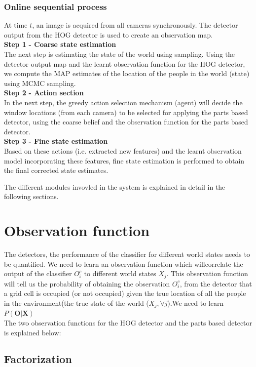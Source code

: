 \documentclass[10pt,twocolumn,letterpaper]{article}
\begin{document}
\subsubsection{Online sequential process}
At time $t $, an image is acquired from all cameras synchronously. The detector output from the HOG detector is used to create an observation map.\\
\textbf{Step 1 - Coarse state estimation}\\
The next step is estimating the state of the world using sampling. Using the detector output map and the learnt observation function for the HOG detector, we compute the MAP estimates of the location of the people in the world (state) using MCMC sampling.\\ 
\textbf{Step 2 - Action section}\\
In the next step, the greedy action selection mechanism (agent) will
decide the window locations (from each camera) to be selected for applying the parts based detector, using the coarse belief and the observation function for the parts based detector.\\
\textbf{Step 3 - Fine state estimation}\\
Based on these actions (i.e. extracted new features)
and the learnt observation model incorporating these features, fine state estimation is performed to obtain the final corrected state estimates.

The different modules invovled in the system is explained in detail in the following sections.

\section{Observation function}
The detectors, the performance of the classifier for different world states needs
to be quantified. We need to learn an observation function which willcorrelate the output of the classifier $O^{c}_{i}$ to different world
states $X_{j}$.
This observation function will tell us the probability of
obtaining the observation $ O^{c}_{i} $, from the detector that a grid cell is occupied (or not occupied) given the true location of all the people in the environment(the true state of the world ($ X_{j},\forall j $).We need to learn $ P(\textbf{O}|\textbf{X})  $\\

The two observation functions for the HOG detector and the parts based detector is explained below:

\subsection{Factorization}
\end{document}
